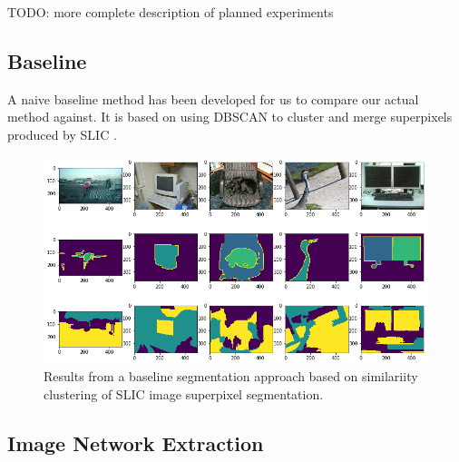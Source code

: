 \documentclass[twocolumn]{article}
\newcommand{\todo}[1]{}
\renewcommand{\todo}[1]{{\color{red} TODO: {#1}}}
\newcommand{\figlab}[1]{\label{fig:#1}}
\begin{document}
\todo{more complete description of planned experiments}

\subsection{Baseline}

A naive baseline method has been developed for us to compare our actual method
against. It is based on using DBSCAN \cite{ester1996density} to cluster and
merge superpixels produced by SLIC \cite{achanta2010slic}.

\begin{figure}

\centering
\includegraphics[width=\linewidth]{figs/searched.png}
\caption{Results from a baseline segmentation approach based on similariity
clustering of SLIC image superpixel segmentation.}
\figlab{baseline}

\end{figure}

\subsection{Image Network Extraction}
\end{document}
